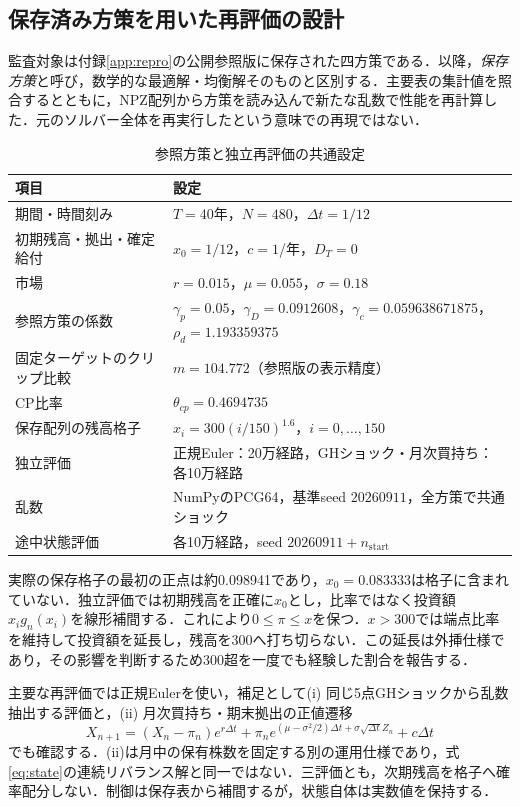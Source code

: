 \documentclass[10pt,a4paper]{article}
\numberwithin{equation}{section}
\numberwithin{table}{section}
\numberwithin{figure}{section}
\theoremstyle{plain}
\theoremstyle{definition}
\begin{document}
\subsection{保存済み方策を用いた再評価の設計}
\label{sec:design}
監査対象は付録\ref{app:repro}の公開参照版に保存された四方策である．以降，\emph{保存方策}と呼び，数学的な最適解・均衡解そのものと区別する．主要表の集計値を照合するとともに，NPZ配列から方策を読み込んで新たな乱数で性能を再計算した．元のソルバー全体を再実行したという意味での再現ではない．

\begin{table}[htbp]\centering\small
\caption{参照方策と独立再評価の共通設定}\label{tab:params}
\begin{tabularx}{\textwidth}{p{56mm}X}
\toprule 項目 & 設定 \\ \midrule
期間・時間刻み & $T=40$年，$N=480$，$\Delta t=1/12$ \\
初期残高・拠出・確定給付 & $x_0=1/12$，$c=1$/年，$D_T=0$ \\
市場 & $r=0.015$，$\mu=0.055$，$\sigma=0.18$ \\
参照方策の係数 & $\gamma_p=0.05$，$\gamma_D=0.0912608$，$\gamma_c=0.059638671875$，$\rho_d=1.193359375$ \\
固定ターゲットのクリップ比較 & $m=104.772$（参照版の表示精度） \\
CP比率 & $\theta_{cp}=0.4694735$ \\
保存配列の残高格子 & $x_i=300(i/150)^{1.6}$，$i=0,\ldots,150$ \\
独立評価 & 正規Euler：20万経路，GHショック・月次買持ち：各10万経路 \\
乱数 & NumPyのPCG64，基準seed $20260911$，全方策で共通ショック \\
途中状態評価 & 各10万経路，seed $20260911+n_{\mathrm{start}}$ \\
\bottomrule\end{tabularx}\end{table}

実際の保存格子の最初の正点は約0.098941であり，$x_0=0.083333$は格子に含まれていない．独立評価では初期残高を正確に$x_0$とし，比率ではなく投資額$x_ig_n(x_i)$を線形補間する．これにより$0\leq\pi\leq x$を保つ．$x>300$では端点比率を維持して投資額を延長し，残高を300へ打ち切らない．この延長は外挿仕様であり，その影響を判断するため300超を一度でも経験した割合を報告する．

主要な再評価では正規Eulerを使い，補足として(i) 同じ5点GHショックから乱数抽出する評価と，(ii) 月次買持ち・期末拠出の正値遷移
\begin{equation}
X_{n+1}=(X_n-\pi_n)e^{r\Delta t}
+\pi_ne^{(\mu-\sigma^2/2)\Delta t+\sigma\sqrt{\Delta t}Z_n}+c\Delta t
\label{eq:buyhold}
\end{equation}
でも確認する．(ii)は月中の保有株数を固定する別の運用仕様であり，式\eqref{eq:state}の連続リバランス解と同一ではない．三評価とも，次期残高を格子へ確率配分しない．制御は保存表から補間するが，状態自体は実数値を保持する．
\end{document}
